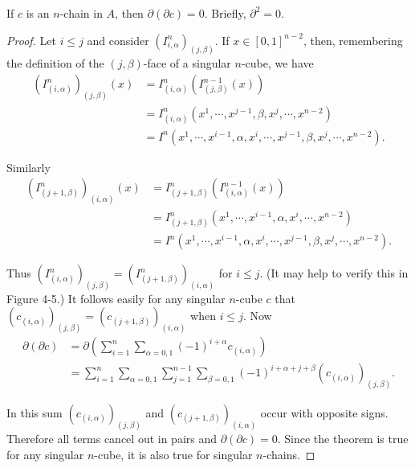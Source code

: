 \begin{theorem}
    If $c$ is an $n$-chain in $A$, then $\partial(\partial c) = 0$. Briefly, 
    $\partial^2 = 0$.
\end{theorem}

\begin{proof}
    Let $i\le j$ and consider $(I^n_{i,\alpha})_{(j,\beta)}$. If $x\in [0,1]^{n-2}$,
    then, remembering the definition of the $(j,\beta)$-face of a singular $n$-cube, we have 
    \begin{align*}
        (I^n_{(i,\alpha)})_{(j,\beta)}(x) 
        & = I^n_{(i,\alpha)}(I^{n-1}_{(j,\beta)}(x))\\
        & = I^n_{(i,\alpha)}(x^1,\cdots,x^{j-1},\beta,x^j,\cdots,x^{n-2}) \\
        & = I^{{n}}(x^{1},\cdots,x^{{i}-1},\alpha,x^{{i}},\cdots,x^{{j}-1},{\beta},x^{{j}},\cdots,x^{{n}-2}).
    \end{align*}

    Similarly
    \begin{align*}
        (I^n_{(j+1,\beta)})_{(i,\alpha)}(x) 
        & = I^n_{(j+1,\beta)}(I^{n-1}_{(i,\alpha)}(x))\\
        & = I^n_{(j+1,\beta)}(x^1,\cdots,x^{i-1},\alpha,x^i,\cdots,x^{n-2}) \\
        & = I^{{n}}(x^{1},\cdots,x^{{i-1}},\alpha,x^{i},\cdots,x^{{j}-1},{\beta},x^{{j}},\cdots,x^{{n}-2}).
    \end{align*}

    Thus $(I_{(i,\alpha)}^n)_{(j,\beta)}=(I_{(j+1,\beta)}^n)_{(i,\alpha)}$ for $i\le j$.
    (It may help to verify this in Figure 4-5.) It follows easily for any singular
    $n$-cube $c$ that $(c_{(i,\alpha)})_{(j,\beta)}=(c_{(j+1,\beta)})_{(i,\alpha)}$ when $i\le j$.
    Now
    \begin{align*}
        \partial(\partial c)
        & = \partial\left(\sum_{i=1}^n\sum_{\alpha=0,1}(-1)^{i+\alpha}c_{(i,\alpha)}\right) \\
        & = \sum_{i=1}^{n}\sum_{\alpha=0,1}\sum_{j=1}^{n-1}{\sum_{\beta=0,1}^{}{(-1)^{i+\alpha+j+\beta}(c_{(i,\alpha)})_{(j,\beta)}}}.
    \end{align*} 

    In this sum $(c_{(i,\alpha)})_{(j,\beta)}$ and $(c_{(j+1,\beta)})_{(i,\alpha)}$ occur 
    with opposite signs. Therefore all terms cancel out in pairs and $\partial(\partial c) = 0$. 
    Since the theorem is true for any singular $n$-cube, it is also true for singular $n$-chains.
\end{proof}

